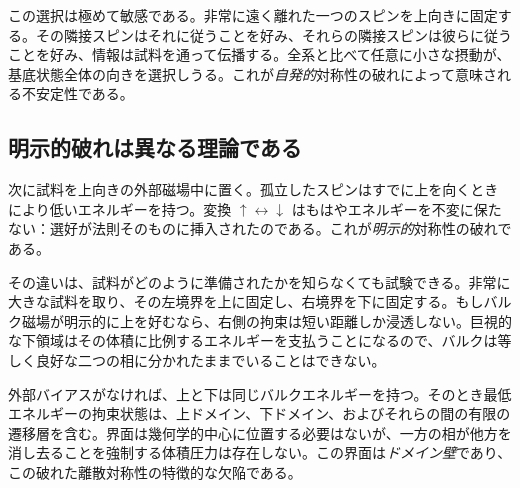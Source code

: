 この選択は極めて敏感である。非常に遠く離れた一つのスピンを上向きに固定する。その隣接スピンはそれに従うことを好み、それらの隣接スピンは彼らに従うことを好み、情報は試料を通って伝播する。全系と比べて任意に小さな摂動が、基底状態全体の向きを選択しうる。これが\emph{自発的}対称性の破れによって意味される不安定性である。

\begin{classroomqa}
\end{classroomqa}

\begin{classroomqa}
\end{classroomqa}

\subsection{明示的破れは異なる理論である}

次に試料を上向きの外部磁場中に置く。孤立したスピンはすでに上を向くときにより低いエネルギーを持つ。変換
\(\uparrow\leftrightarrow\downarrow\)
はもはやエネルギーを不変に保たない：選好が法則そのものに挿入されたのである。これが\emph{明示的}対称性の破れである。

その違いは、試料がどのように準備されたかを知らなくても試験できる。非常に大きな試料を取り、その左境界を上に固定し、右境界を下に固定する。もしバルク磁場が明示的に上を好むなら、右側の拘束は短い距離しか浸透しない。巨視的な下領域はその体積に比例するエネルギーを支払うことになるので、バルクは等しく良好な二つの相に分かれたままでいることはできない。

外部バイアスがなければ、上と下は同じバルクエネルギーを持つ。そのとき最低エネルギーの拘束状態は、上ドメイン、下ドメイン、およびそれらの間の有限の遷移層を含む。界面は幾何学的中心に位置する必要はないが、一方の相が他方を消し去ることを強制する体積圧力は存在しない。この界面は\emph{ドメイン壁}であり、この破れた離散対称性の特徴的な欠陥である。

